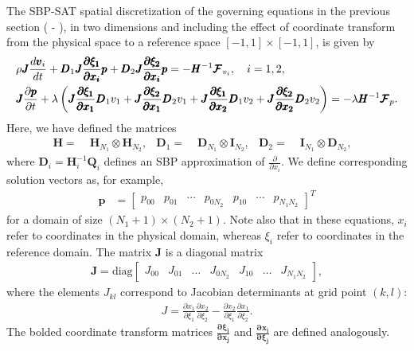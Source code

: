 The SBP-SAT spatial discretization of the governing equations in the previous section ( - ),
in two dimensions and including the effect of coordinate transform from the physical
space to a reference space $[-1,1]\times[-1,1]$, is given by
\begin{align}
	&\rho \pmb{J} \frac{d \pmb{v}_{i}}{dt}
	+ \pmb{D}_{1} \pmb{J} \frac{ \pmb{\partial \xi_{1}}}{\pmb{\partial x_{i}}} \pmb{p}
	+ \pmb{D}_{2} \pmb{J}\frac{\pmb{\partial \xi_{2}}}{\pmb{\partial x_{i}}} \pmb{p} =
	- \pmb{{H}}^{-1}\pmb{\mathcal{F}}_{v_{i}}, \quad i=1,2,\\
	&\pmb{J}\frac{\partial \pmb{p}}{\partial t} +\lambda\left(
	\pmb{J}\frac{\pmb{\partial \xi_{1}}}{\pmb{\partial x_{1}}} \pmb{D}_{1} v_{1}
	+ \pmb{J}\frac{\pmb{\partial \xi_{2}}}{\pmb{\partial x_{1}}} \pmb{D}_{2} v_{1}
	+ \pmb{J}\frac{\pmb{\partial \xi_{1}}}{\pmb{\partial x_{2}}} \pmb{D}_{1} v_{2}
	+ \pmb{J}\frac{\pmb{\partial \xi_{2}}}{\pmb{\partial x_{2}}} \pmb{D}_{2} v_{2}
  \right)
  =
	-\lambda \pmb{H}^{-1} \pmb{\mathcal{F}}_{p}.
\end{align}
Here, we have defined the matrices
\begin{align}
	\pmb{H}     =\;& \pmb{H}_{N_{1}}\otimes \pmb{H}_{N_{2}},&
	\pmb{D}_{1} =\;& \pmb{D}_{N_{1}}\otimes \pmb{I}_{N_{2}},&
	\pmb{D}_{2} =\;& \pmb{I}_{N_{1}}\otimes \pmb{D}_{N_{2}},&
\end{align}
where $\pmb{D}_{i} = \pmb{H}_{i}^{-1}\pmb{Q}_{i}$ defines an SBP approximation of $\frac{\partial}{\partial x_{i}}$.
We define corresponding solution vectors as, for example,
\begin{align}
  \pmb{p} &=
  \begin{bmatrix}
    p_{00} & p_{01} & \cdots & p_{0N_{2}} & p_{10} & \cdots & p_{N_{1}N_{2}}
  \end{bmatrix}^{T}
\end{align}
for a domain of size $(N_{1}+1) \times (N_{2}+1)$.
Note also that in these equations, $x_{i}$ refer to coordinates in the physical domain,
whereas $\xi_{i}$ refer to coordinates in the reference domain. The matrix $\pmb{J}$ is
a diagonal matrix
\begin{align}
  \pmb{J} = \text{diag}
  \begin{bmatrix}
	  J_{00} & J_{01} & \hdots & J_{0N_{2}} & J_{10} & \hdots & J_{N_{1}N_{2}} \label{eq:sbp_jac}
  \end{bmatrix},
\end{align}
where the elements $J_{kl}$ correspond to Jacobian determinants at grid point $(k,l)$:
\begin{align}
J = \frac{\partial x_{1}}{\partial \xi_{1}} \frac{\partial x_{2}}{\partial \xi_{2}} -
    \frac{\partial x_{2}}{\partial \xi_{1}} \frac{\partial x_{1}}{\partial \xi_{2}}.
\end{align}
The bolded coordinate transform matrices $\frac{\pmb{\partial \xi_{i}}}{\pmb{\partial x_{j}}}$
and $\frac{\pmb{\partial x_{i}}}{\pmb{\partial \xi_{j}}}$ are defined analogously.


